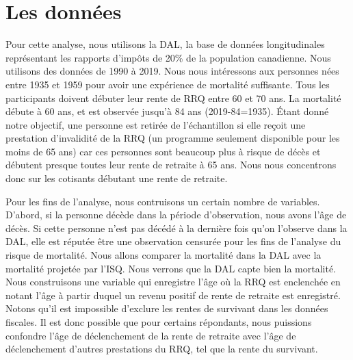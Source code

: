 \documentclass[french, 12pt]{article}
\begin{document}
 
	\section{Les données}
	
	Pour cette analyse, nous utilisons la DAL, la base de données longitudinales représentant les rapports d'impôts de 20\% de la population canadienne. Nous utilisons des données de 1990 à 2019. Nous nous intéressons aux personnes nées entre 1935 et 1959 pour avoir une expérience de mortalité suffisante. Tous les participants doivent débuter leur rente de RRQ entre 60 et 70 ans. La mortalité débute à 60 ans, et est observée jusqu’à 84 ans (2019-84=1935).  Étant donné notre objectif, une personne est retirée de l’échantillon si elle reçoit une prestation d’invalidité de la RRQ (un programme seulement disponible pour les moins de 65 ans) car ces personnes sont beaucoup plus à risque de décès et débutent presque toutes leur rente de retraite à 65 ans. Nous nous concentrons donc sur les cotisants débutant une rente de retraite. 
	
	Pour les fins de l'analyse, nous contruisons un certain nombre de variables. D'abord, si la personne décède dans la période d'observation, nous avons l'âge de décès. Si cette personne n'est pas décédé à la dernière fois qu'on l'observe dans la DAL, elle est réputée être une observation censurée pour les fins de l'analyse du risque de mortalité. Nous allons comparer la mortalité dans la DAL avec la mortalité projetée par l'ISQ. Nous verrons que la DAL capte bien la mortalité. Nous construisons une variable qui enregistre l'âge où la RRQ est enclenchée en notant l'âge à partir duquel un revenu positif de rente de retraite est enregistré. Notons qu'il est impossible d'exclure les rentes de survivant dans les données fiscales. Il est donc possible que pour certains répondants, nous puissions confondre l'âge de déclenchement de la rente de retraite avec l'âge de déclenchement d'autres prestations du RRQ, tel que la rente du survivant. 
	
\end{document}
